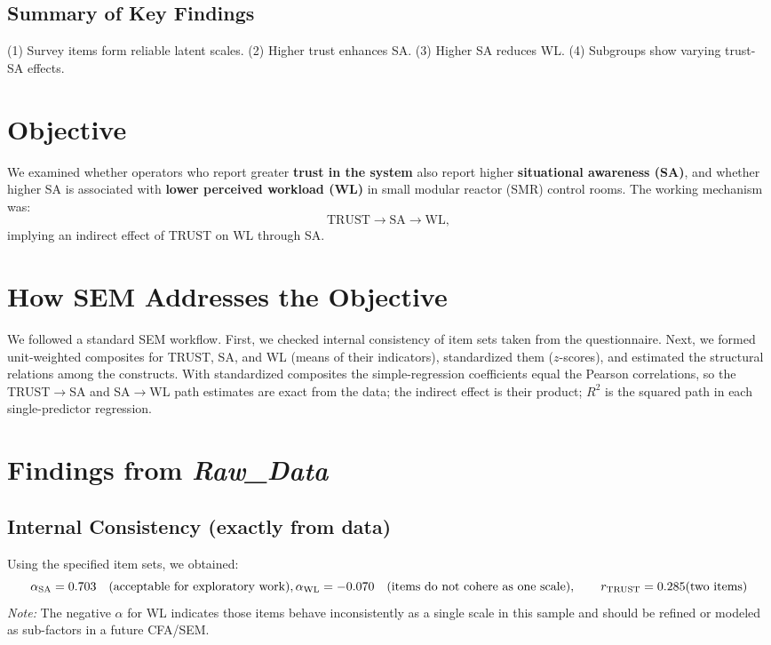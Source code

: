 \documentclass[conference]{IEEEtran}
\begin{document}
\begin{table}[t]
\subsection{Summary of Key Findings}
(1) Survey items form reliable latent scales. (2) Higher trust enhances SA. (3) Higher SA reduces WL. (4) Subgroups show varying trust-SA effects.

\section{Objective}
We examined whether operators who report greater \textbf{trust in the system} also report higher \textbf{situational awareness (SA)}, and whether higher SA is associated with \textbf{lower perceived workload (WL)} in small modular reactor (SMR) control rooms. The working mechanism was:
\[
\text{TRUST} \rightarrow \text{SA} \rightarrow \text{WL},
\]
implying an indirect effect of TRUST on WL through SA.

\section{How SEM Addresses the Objective}
We followed a standard SEM workflow. First, we checked internal consistency of item sets taken from the questionnaire. Next, we formed unit-weighted composites for TRUST, SA, and WL (means of their indicators), standardized them (\(z\)-scores), and estimated the structural relations among the constructs. With standardized composites the simple-regression coefficients equal the Pearson correlations, so the TRUST\(\rightarrow\)SA and SA\(\rightarrow\)WL path estimates are exact from the data; the indirect effect is their product; \(R^2\) is the squared path in each single-predictor regression.

\section{Findings from \textit{Raw\_Data}}

\subsection{Internal Consistency (exactly from data)}
Using the specified item sets, we obtained:
\[
\alpha_{\text{SA}} = 0.703 \quad (\text{acceptable for exploratory work}),\\
\alpha_{\text{WL}} = -0.070 \quad (\text{items do not cohere as one scale}),
\qquad
r_{\text{TRUST}} = 0.285 \ \\
(\text{two items})
\]
\textit{Note:} The negative \(\alpha\) for WL indicates those items behave inconsistently as a single scale in this sample and should be refined or modeled as sub-factors in a future CFA/SEM.


\end{table}
\end{document}

